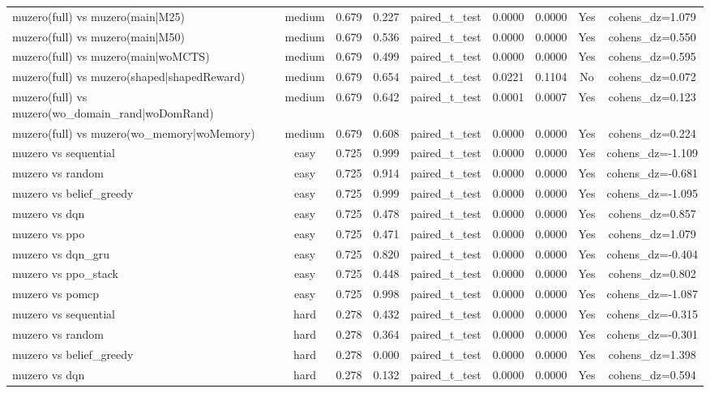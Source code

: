 \begin{table}[htbp]
\begin{tabular}{lcccccccc}
muzero(full) vs muzero(main|M25) & medium & 0.679 & 0.227 & paired_t_test & 0.0000 & 0.0000 & Yes & cohens_dz=1.079 \\
muzero(full) vs muzero(main|M50) & medium & 0.679 & 0.536 & paired_t_test & 0.0000 & 0.0000 & Yes & cohens_dz=0.550 \\
muzero(full) vs muzero(main|woMCTS) & medium & 0.679 & 0.499 & paired_t_test & 0.0000 & 0.0000 & Yes & cohens_dz=0.595 \\
muzero(full) vs muzero(shaped|shapedReward) & medium & 0.679 & 0.654 & paired_t_test & 0.0221 & 0.1104 & No & cohens_dz=0.072 \\
muzero(full) vs muzero(wo_domain_rand|woDomRand) & medium & 0.679 & 0.642 & paired_t_test & 0.0001 & 0.0007 & Yes & cohens_dz=0.123 \\
muzero(full) vs muzero(wo_memory|woMemory) & medium & 0.679 & 0.608 & paired_t_test & 0.0000 & 0.0000 & Yes & cohens_dz=0.224 \\
muzero vs sequential & easy & 0.725 & 0.999 & paired_t_test & 0.0000 & 0.0000 & Yes & cohens_dz=-1.109 \\
muzero vs random & easy & 0.725 & 0.914 & paired_t_test & 0.0000 & 0.0000 & Yes & cohens_dz=-0.681 \\
muzero vs belief_greedy & easy & 0.725 & 0.999 & paired_t_test & 0.0000 & 0.0000 & Yes & cohens_dz=-1.095 \\
muzero vs dqn & easy & 0.725 & 0.478 & paired_t_test & 0.0000 & 0.0000 & Yes & cohens_dz=0.857 \\
muzero vs ppo & easy & 0.725 & 0.471 & paired_t_test & 0.0000 & 0.0000 & Yes & cohens_dz=1.079 \\
muzero vs dqn_gru & easy & 0.725 & 0.820 & paired_t_test & 0.0000 & 0.0000 & Yes & cohens_dz=-0.404 \\
muzero vs ppo_stack & easy & 0.725 & 0.448 & paired_t_test & 0.0000 & 0.0000 & Yes & cohens_dz=0.802 \\
muzero vs pomcp & easy & 0.725 & 0.998 & paired_t_test & 0.0000 & 0.0000 & Yes & cohens_dz=-1.087 \\
muzero vs sequential & hard & 0.278 & 0.432 & paired_t_test & 0.0000 & 0.0000 & Yes & cohens_dz=-0.315 \\
muzero vs random & hard & 0.278 & 0.364 & paired_t_test & 0.0000 & 0.0000 & Yes & cohens_dz=-0.301 \\
muzero vs belief_greedy & hard & 0.278 & 0.000 & paired_t_test & 0.0000 & 0.0000 & Yes & cohens_dz=1.398 \\
muzero vs dqn & hard & 0.278 & 0.132 & paired_t_test & 0.0000 & 0.0000 & Yes & cohens_dz=0.594 \\

\end{tabular}
\end{table}
